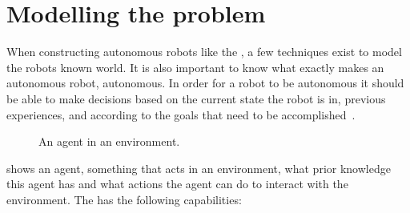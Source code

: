 \section{Modelling the problem} \label{sec:model}

When constructing autonomous robots like the \projname{}, a few techniques exist to model the robots known world. It is also important to know what exactly makes an autonomous robot, autonomous. In order for a robot to be autonomous it should be able to make decisions based on the current state the robot is in, previous experiences, and according to the goals that need to be accomplished~\citep{artificialintelligencebook}. 

\begin{figure}[H]
     \center{}
     \caption{\label{fig:model_mi_agent} An agent in an environment.}
\end{figure}

 shows an agent, something that acts in an environment, what prior knowledge this agent has and what actions the agent can do to interact with the environment. The \projname{} has the following capabilities:

